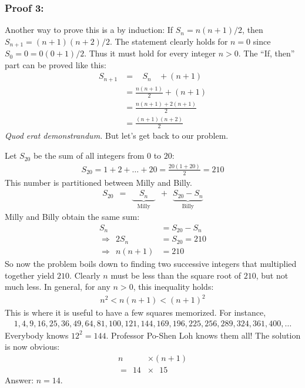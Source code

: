 \documentclass[12pt]{article}
\begin{document}
\begin{answer}
\subsubsection*{Proof 3:}
Another way to prove this is a by induction: If $S_{n}=n(n+1)/2$, then $S_{n+1}=(n+1)(n+2)/2$. The statement clearly holds for $n=0$ since $S_{0} = 0 = 0 (0+1)/2$. Thus it must hold for every integer $n>0$. The ``If, then'' part can be proved like this:
\begin{align*}
S_{n+1} 
  & = ~~~~ S_{n} ~~~~+ (n+1) \\
  & = \frac{n(n+1)}{2} + (n+1) \\
  & = \frac{n(n+1)+2(n+1)}{2} \\
  & = \frac{(n+1)(n+2)}{2}
\end{align*}
\textit{Quod erat demonstrandum.} But let's get back to our problem.
\bigskip

Let $S_{20}$ be the sum of all integers from $0$ to $20$:
\begin{align*}
S_{20} = 1 + 2 + \ldots + 20 
= \frac{20(1+20)}{2}
= 210
\end{align*}
This number is partitioned between Milly and Billy.
\begin{align*}
S_{20} ~~ = ~~ \underbrace{~~~~S_{n}~~~~}_{\text{Milly}} ~~+~~ \underbrace{S_{20}-S_{n}}_{\text{Billy}}
\end{align*}
Milly and Billy obtain the same sum: 
\begin{align*}
S_{n} & = S_{20}-S_{n} \\
\Rightarrow ~~
2S_{n} & = S_{20} = 210 \\
\Rightarrow ~~
n (n+1) & = 210
\end{align*}
So now the problem boils down to finding two successive integers that multiplied together yield $210$. Clearly $n$ must be less than the square root of $210$, but not much less. In general, for any $n>0$, this inequality holds:
\begin{align*}
n^2 < n(n+1) < (n+1)^2
\end{align*}
This is where it is useful to have a few squares memorized. For instance,
\begin{align*}
1, 4, 9, 16, 25, 36, 49, 64, 81, 100, 121, 144, 169, 196, 225, 256, 289, 324, 361, 400, \ldots 
\end{align*}
Everybody knows $12^2=144$. Professor Po-Shen Loh knows them all! The solution is now obvious:
\begin{align*}
n  & \times (n+1) \\
= ~~ 14 & \times ~~~ 15
\end{align*}
Answer: $n=14$.
\end{answer}
\end{document}
